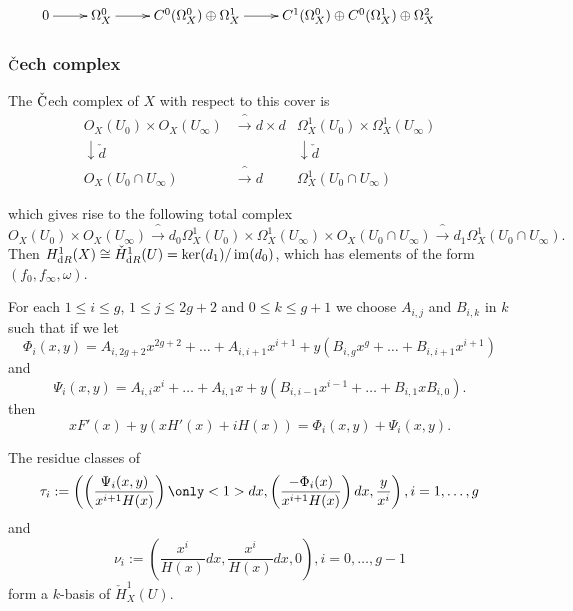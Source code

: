 \documentclass{beamer}
\begin{document}
\begin{frame}
{\begin{displaymath}
\xymatrix{
0 \ar[r]  & \Omega_X^0 \ar[r] & C^0(\Omega_X^0) \oplus \Omega_X^1  \ar[r] & C^1(\Omega_X^0) \oplus C^0(\Omega_X^1) \oplus \Omega_X^2 & 
}
\end{displaymath}}
\end{frame}

%
\begin{frame}
\frametitle{$\check{\text C}$ech complex}
The $\check {\text C}$ech complex of $X$ with respect to this cover is
\[
\begin{array}{ccc}
        O_X(U_0)\times O_X(U_\infty) & \xrightarrow^{d \times d}  & \Omega^1_X(U_0) \times \Omega_X^1(U_\infty)  \\
        \downarrow \check{d}             &           & \downarrow \check{d}\\
        O_X(U_0\cap U_\infty) & \xrightarrow^{d}                      & \Omega_X^1(U_0 \cap U_\infty)
\end{array}
\]
\pause

which gives rise to the following total complex
\begin{equation*}
O_X(U_0) \times O_X(U_\infty) \xrightarrow^{d_0} \Omega_X^1(U_0)\times \Omega_X^1(U_\infty) \times O_X(U_0 \cap U_\infty) \xrightarrow^{d_1} \Omega^1_X(U_0 \cap U_\infty).
\end{equation*}
\pause
Then $H^1_{\text dR}(X) \cong \check{H}^1_{\text dR}(U) = \operatorname{ker}(d_1)/\operatorname{im}(d_0)$, which has elements of the form $(f_0, f_\infty , \omega)$.
\end{frame}

\begin{frame}
For each $1\leq i \leq g$, $1\le j \leq 2g+2$ and $0\leq k \leq g+1$ we choose $A_{i,j}$ and $B_{i,k}$ in $k$ such that if we let
\[
\Phi_i(x,y) = A_{i,2g+2}x^{2g+2} + \ldots + A_{i,i+1}x^{i+1} + y(B_{i,g}x^g + \ldots + B_{i,i+1}x^{i+1})
\]
and
\[
\Psi_i(x,y) = A_{i,i}x^{i} + \ldots + A_{i,1}x+ y(B_{i,i-1}x^{i-1} + \ldots + B_{i,1}x B_{i,0}).
\]
then
\[
xF'(x) + y(xH'(x) + iH(x)) = \Phi_i(x,y) + \Psi_i(x,y).
\]
\pause
\begin{theorem}
The residue classes of
\[
\tau_i := \left( \left( \frac{\Psi_i(x,y)}{x^{i+1}H(x)} \right) \only<1>{dx}, \left(\frac{-\Phi_i(x)}{x^{i+1}H(x)} \right)dx, \frac{y}{x^i} \right), i= 1, \ldots, g
\]
and
\[
\nu_i := \left( \frac{x^i}{H(x)}dx, \frac{x^i}{H(x)}dx, 0 \right), i = 0, \ldots, g-1
\]
form a $k$-basis of $\check{H}^1_X(U)$.

\end{theorem}
\end{frame}
\end{document}
